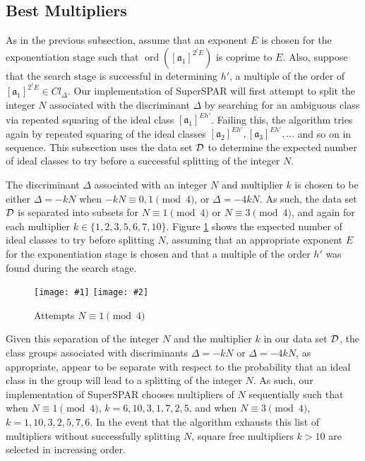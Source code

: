 \documentclass{ucalgthes1}
\theoremstyle{definition}
\DeclareMathOperator{\ord}{ord}
\newcommand{\ideal}{\mathfrak}
\newcommand{\idealclass}[1]{\left[ \ideal #1 \right]}
\newcommand{\mygraphTwo}[4]{
	\begin{figure}[htb]
	\centering
	\texttt{[image: \#1]}
	\texttt{[image: \#2]}
	\caption{#4}
	\label{#3}
	\end{figure}
}
\begin{document}
\subsection{Best Multipliers}
\label{subsec:ssparBestMultipliers}

As in the previous subsection, assume that an exponent $E$ is chosen for the exponentiation stage such that $\ord(\idealclass{a_1}^{2^\ell E})$ is coprime to $E$.  Also, suppose that the search stage is successful in determining $h'$, a multiple of the order of $\idealclass{a_1}^{2^\ell E} \in Cl_\Delta$.  Our implementation of SuperSPAR will first attempt to split the integer $N$ associated with the discriminant $\Delta$ by searching for an ambiguous class via repeated squaring of the ideal class $\idealclass{a_1}^{Eh'}$.  Failing this, the algorithm tries again by repeated squaring of the ideal classes $\idealclass{a_2}^{Eh'}, \idealclass{a_3}^{Eh'}, ...$ and so on in sequence.  This subsection uses the data set $\mathcal D$ to determine the expected number of ideal classes to try before a successful splitting of the integer $N$.

The discriminant $\Delta$ associated with an integer $N$ and multiplier $k$ is chosen to be either $\Delta = -kN$ when $-kN \equiv 0, 1 \pmod 4$, or $\Delta = -4kN$.  As such, the data set $\mathcal D$ is separated into subsets for $N \equiv 1 \pmod 4$ or $N \equiv 3 \pmod 4$, and again for each multiplier $k \in \{1, 2, 3, 5, 6, 7, 10\}$.  Figure \ref{fig:ssparIdealAttempts} shows the expected number of ideal classes to try before splitting $N$, assuming that an appropriate exponent $E$ for the exponentiation stage is chosen and that a multiple of the order $h'$ was found during the search stage.

\mygraphTwo{attempts-n1}{attempts-n3}{fig:ssparIdealAttempts}{Attempts $N \equiv 1 \pmod 4$}

Given this separation of the integer $N$ and the multiplier $k$ in our data set $\mathcal D$, the class groups associated with discriminants $\Delta = -kN$ or $\Delta = -4kN$, as appropriate, appear to be separate with respect to the probability that an ideal class in the group will lead to a splitting of the integer $N$.  As such, our implementation of SuperSPAR chooses multipliers of $N$ sequentially such that when $N \equiv 1 \pmod 4$, $k=6, 10, 3, 1, 7, 2, 5$, and when $N \equiv 3 \pmod 4$, $k=1, 10, 3, 2, 5, 7, 6$.  In the event that the algorithm exhausts this list of multipliers without successfully splitting $N$, square free multipliers $k > 10$ are selected in increasing order.
\end{document}

